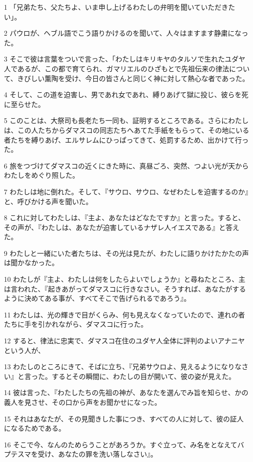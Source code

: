 \par 1 「兄弟たち、父たちよ、いま申し上げるわたしの弁明を聞いていただきたい」。
\par 2 パウロが、ヘブル語でこう語りかけるのを聞いて、人々はますます静粛になった。
\par 3 そこで彼は言葉をついで言った、「わたしはキリキヤのタルソで生れたユダヤ人であるが、この都で育てられ、ガマリエルのひざもとで先祖伝来の律法について、きびしい薫陶を受け、今日の皆さんと同じく神に対して熱心な者であった。
\par 4 そして、この道を迫害し、男であれ女であれ、縛りあげて獄に投じ、彼らを死に至らせた。
\par 5 このことは、大祭司も長老たち一同も、証明するところである。さらにわたしは、この人たちからダマスコの同志たちへあてた手紙をもらって、その地にいる者たちを縛りあげ、エルサレムにひっぱってきて、処罰するため、出かけて行った。
\par 6 旅をつづけてダマスコの近くにきた時に、真昼ごろ、突然、つよい光が天からわたしをめぐり照した。
\par 7 わたしは地に倒れた。そして、『サウロ、サウロ、なぜわたしを迫害するのか』と、呼びかける声を聞いた。
\par 8 これに対してわたしは、『主よ、あなたはどなたですか』と言った。すると、その声が、『わたしは、あなたが迫害しているナザレ人イエスである』と答えた。
\par 9 わたしと一緒にいた者たちは、その光は見たが、わたしに語りかけたかたの声は聞かなかった。
\par 10 わたしが『主よ、わたしは何をしたらよいでしょうか』と尋ねたところ、主は言われた、『起きあがってダマスコに行きなさい。そうすれば、あなたがするように決めてある事が、すべてそこで告げられるであろう』。
\par 11 わたしは、光の輝きで目がくらみ、何も見えなくなっていたので、連れの者たちに手を引かれながら、ダマスコに行った。
\par 12 すると、律法に忠実で、ダマスコ在住のユダヤ人全体に評判のよいアナニヤという人が、
\par 13 わたしのところにきて、そばに立ち、『兄弟サウロよ、見えるようになりなさい』と言った。するとその瞬間に、わたしの目が開いて、彼の姿が見えた。
\par 14 彼は言った、『わたしたちの先祖の神が、あなたを選んでみ旨を知らせ、かの義人を見させ、その口から声をお聞かせになった。
\par 15 それはあなたが、その見聞きした事につき、すべての人に対して、彼の証人になるためである。
\par 16 そこで今、なんのためらうことがあろうか。すぐ立って、み名をとなえてバプテスマを受け、あなたの罪を洗い落しなさい』。
